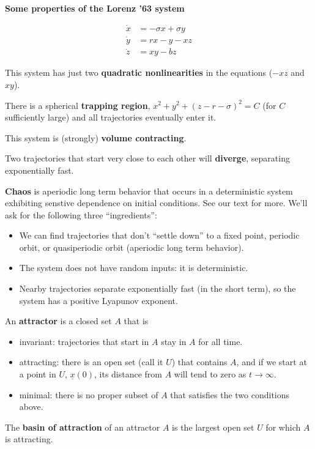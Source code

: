 \documentclass[12pt,letterpaper,noanswers]{exam}
\begin{document}
\begin{tcolorbox}
\textbf{Some properties of the Lorenz '63 system}

\begin{align*}
\dot x &= -\sigma x + \sigma y \\
\dot y &= rx - y - xz \\
\dot z &= xy - bz
\end{align*}

This system has just two \textbf{quadratic nonlinearities} in the equations ($-xz$ and $xy$).

There is a spherical \textbf{trapping region}, $x^2+y^2 + (z-r-\sigma)^2 = C$ (for $C$ sufficiently large) and all trajectories eventually enter it. 

This system is (strongly) \textbf{volume contracting}.

Two trajectories that start very close to each other will \textbf{diverge}, separating exponentially fast.
\end{tcolorbox}

\begin{tcolorbox}
\textbf{Chaos} is aperiodic long term behavior that occurs in a deterministic system exhibiting senstive dependence on initial conditions.  See our text for more.  We'll ask for the following three ``ingredients'':
\begin{itemize}
    \item We can find trajectories that don't ``settle down'' to a fixed point, periodic orbit, or quasiperiodic orbit (aperiodic long term behavior).
    \item The system does not have random inputs: it is deterministic.
    \item Nearby trajectories separate exponentially fast (in the short term), so the system has a positive Lyapunov exponent.
\end{itemize}
An \textbf{attractor} is a closed set $A$ that is 
\begin{itemize}
    \item invariant: trajectories that start in $A$ stay in $A$ for all time.
    \item attracting: there is an open set (call it $U$) that contains $A$, and if we start at a point in $U$, $\underline{x}(0)$, its distance from $A$ will tend to zero as $t\rightarrow \infty$.
    \item minimal: there is no proper subset of $A$ that satisfies the two conditions above.
\end{itemize}
The \textbf{basin of attraction} of an attractor $A$ is the largest open set $U$ for which $A$ is attracting.
\end{tcolorbox}
\end{document}

